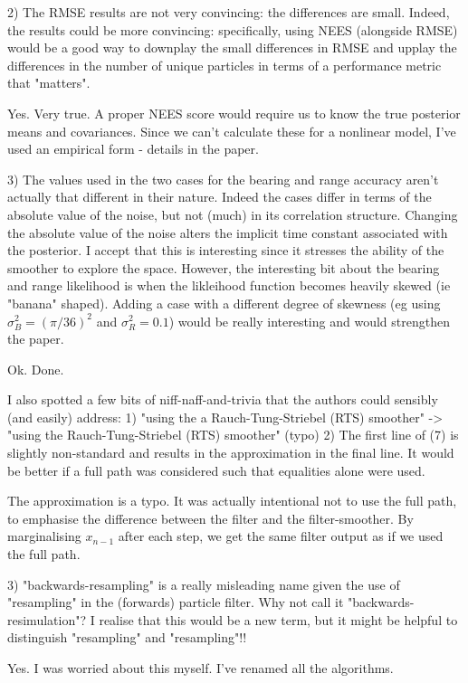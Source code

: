 \documentclass{article}
\begin{document}
2) The RMSE results are not very convincing: the differences are small. Indeed, the results could be more convincing: specifically, using NEES (alongside RMSE) would be a good way to downplay the small differences in RMSE and upplay the differences in the number of unique particles in terms of a performance metric that "matters".

{\meta Yes. Very true. A proper NEES score would require us to know the true posterior means and covariances. Since we can't calculate these for a nonlinear model, I've used an empirical form - details in the paper. }

3) The values used in the two cases for the bearing and range accuracy aren't actually that different in their nature. Indeed the cases differ in terms of the absolute value of the noise, but not (much) in its correlation structure. Changing the absolute value of the noise alters the implicit time constant associated with the posterior. I accept that this is interesting since it stresses the ability of the smoother to explore the space. However, the interesting bit about the bearing and range likelihood is when the likleihood function becomes heavily skewed (ie "banana" shaped). Adding a case with a different degree of skewness (eg using $\sigma_B^2 = (\pi/36)^2$ and $\sigma_R^2 = 0.1$) would be really interesting and would strengthen the paper.

{\meta Ok. Done. }

I also spotted a few bits of niff-naff-and-trivia that the authors could sensibly (and easily) address:
1) "using the a Rauch-Tung-Striebel (RTS) smoother" -> "using the Rauch-Tung-Striebel (RTS) smoother" (typo)
2) The first line of (7) is slightly non-standard and results in the approximation in the final line. It would be better if a full path was considered such that equalities alone were used.

{\meta The approximation is a typo. It was actually intentional not to use the full path, to emphasise the difference between the filter and the filter-smoother. By marginalising $x_{n-1}$ after each step, we get the same filter output as if we used the full path. }

3)  "backwards-resampling" is a really misleading name given the use of "resampling" in the (forwards) particle filter. Why not call it "backwards-resimulation"? I realise that this would be a new term, but it might be helpful to distinguish "resampling" and "resampling"!!

{\meta Yes. I was worried about this myself. I've renamed all the algorithms. }
\end{document}
